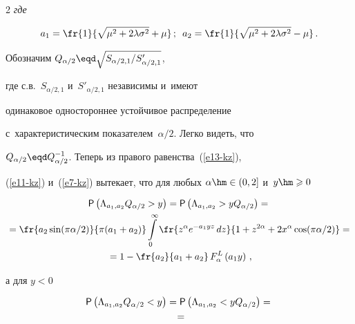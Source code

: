 \begin{multicols}{2}
\textit{где}


$$


a_1=\fr{1}{\sqrt{\mu^2+2\lambda\sigma^2}+\mu}\,;\enskip


a_2=\fr{1}{\sqrt{\mu^2+2\lambda\sigma^2}-\mu}\,.


\label{e14-kz}


$$





\smallskip





Обозначим $Q_{\alpha/2}\eqd\sqrt{S_{\alpha/2,1}/S'_{\alpha/2,1}}$,


где с.в.~$S_{\alpha/2,1}$ и~$S'_{\alpha/2,1}$ независимы и~имеют


одинаковое одностороннее устойчивое распределение 


с~характеристическим показателем~$\alpha/2$. Легко видеть, что


$Q_{\alpha/2}\eqd Q^{-1}_{\alpha/2}$. Теперь из правого равенства~(\ref{e13-kz}), 


(\ref{e11-kz}) и~(\ref{e7-kz}) вытекает, что для любых $\alpha\hm\in(0,2]$ и~$y\hm\geqslant 0$


\begin{multline*}


{\sf P}\left(\Lambda_{a_1,a_2} Q_{\alpha/2}>y\right)= {\sf P}


\left(\Lambda_{a_1,a_2}>y Q_{\alpha/2}\right)={}


\\


{}=


\fr{a_2\sin(\pi\alpha/2)}{\pi(a_1+a_2)}\int\limits_{0}^{\infty}


\fr{z^{\alpha}e^{-a_1yz}\,dz}{1+z^{2\alpha}+2x^{\alpha}\cos(\pi\alpha/2)}={}\\


{}=


1-\fr{a_2}{a_1+a_2}\,F^{L}_{\alpha}\left(a_1y\right)\,,


\end{multline*}


а для $y<0$


\begin{multline*}


{\sf P}\left(\Lambda_{a_1,a_2} Q_{\alpha/2}<y\right)= {\sf P}


\left(\Lambda_{a_1,a_2}<y Q_{\alpha/2}\right)={}


\\{}=



\end{multline*}
\end{multicols}
